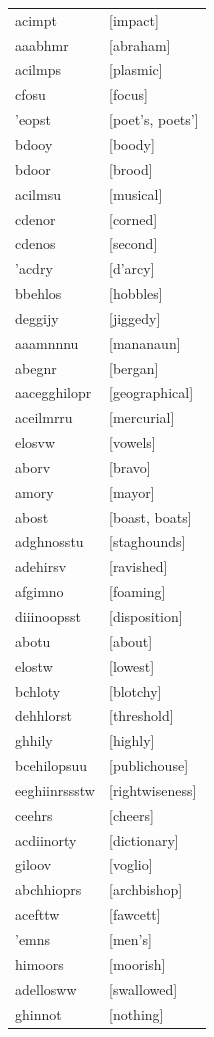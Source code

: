\documentclass{article}
\begin{document}
\begin{tabular}{ll}
acimpt & [impact] \\
aaabhmr & [abraham] \\
acilmps & [plasmic] \\
cfosu & [focus] \\
'eopst & [poet's, poets'] \\
bdooy & [boody] \\
bdoor & [brood] \\
acilmsu & [musical] \\
cdenor & [corned] \\
cdenos & [second] \\
'acdry & [d'arcy] \\
bbehlos & [hobbles] \\
deggijy & [jiggedy] \\
aaamnnnu & [mananaun] \\
abegnr & [bergan] \\
aacegghilopr & [geographical] \\
aceilmrru & [mercurial] \\
elosvw & [vowels] \\
aborv & [bravo] \\
amory & [mayor] \\
abost & [boast, boats] \\
adghnosstu & [staghounds] \\
adehirsv & [ravished] \\
afgimno & [foaming] \\
diiinoopsst & [disposition] \\
abotu & [about] \\
elostw & [lowest] \\
bchloty & [blotchy] \\
dehhlorst & [threshold] \\
ghhily & [highly] \\
bcehilopsuu & [publichouse] \\
eeghiinrssstw & [rightwiseness] \\
ceehrs & [cheers] \\
acdiinorty & [dictionary] \\
giloov & [voglio] \\
abchhioprs & [archbishop] \\
acefttw & [fawcett] \\
'emns & [men's] \\
himoors & [moorish] \\
adellosww & [swallowed] \\
ghinnot & [nothing] \\

\end{tabular}
\end{document}
